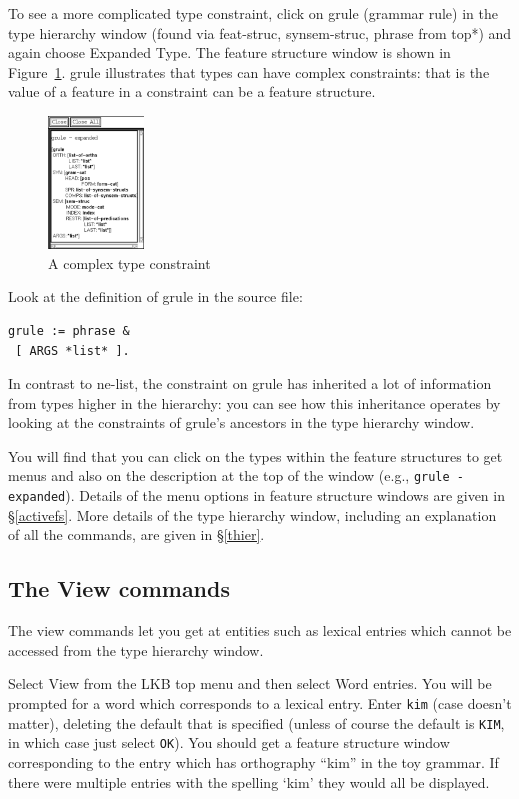 \documentclass[12pt]{report}
\newcommand{\lkbmenucommand}{{\bf}}
\begin{document}
To see a more complicated type constraint, 
click on {\type grule} (grammar rule)
in the type hierarchy 
window (found via {\type feat-struc}, 
{\type synsem-struc}, {\type phrase}
from {\type *top*})
and again choose {\lkbmenucommand Expanded Type}.
The feature structure window is shown in
Figure~\ref{grule}.  {\type grule} illustrates that types can have
complex constraints: that is the value of a feature in a constraint
can be a feature structure.  
\begin{figure}
\includegraphics[width=1in]{figs/grule}
\caption{A complex type constraint}
\label{grule}
\end{figure}
Look at the definition of {\type grule} in the source file:
\begin{verbatim}
grule := phrase &
 [ ARGS *list* ].
\end{verbatim}
In contrast to {\type ne-list}, the constraint on
{\type grule} has inherited a lot of
information from types higher in the
hierarchy: you can see how this inheritance
operates by looking at the constraints of {\type grule}'s ancestors in the
type hierarchy window.

You will find that
you can click on the types within the feature structures to get menus
and also on the description at the top of the window
(e.g., {\tt grule - expanded}).
Details of the menu options in feature structure windows 
are given in \S\ref{activefs}.
More details of the type hierarchy window, including an explanation of all the
commands,
are given in \S\ref{thier}.

\subsection{The View commands}

The view commands let you get at entities such as lexical entries which cannot
be accessed from the type hierarchy window.  

Select {\lkbmenucommand View} from the LKB top menu and then select 
{\lkbmenucommand Word entries}.
You will be prompted for a word which corresponds to a lexical entry.
Enter {\tt kim} (case doesn't matter), deleting the default that
is specified (unless of course the default is {\tt KIM}, in which
case just select {\tt OK}).
You should get a feature structure window corresponding to the entry 
which has orthography ``kim'' in the toy grammar.
If there were multiple entries with the spelling `kim' they would all
be displayed. 
\end{document}
